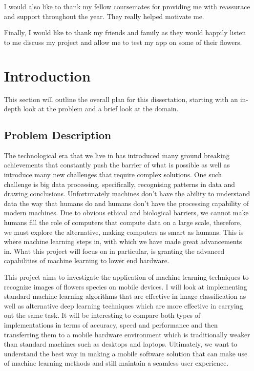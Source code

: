 \documentclass[12pt,a4paper]{report}
\begin{document}
I would also like to thank my fellow coursemates for providing me with reassurace and support throughout the year. They
really helped motivate me.

\par

Finally, I would like to thank my friends and family as they would happily listen to me discuss my project and allow me
to test my app on some of their flowers.

\clearpage
{}
\chapter{Introduction}

This section will outline the overall plan for this dissertation, starting with an in-depth look at the problem and a 
brief look at the domain.

\section{Problem Description}

The technological era that we live in has introduced many ground breaking achievements that constantly push the barrier 
of what is possible as well as introduce many new challenges that require complex solutions. One such challenge is big 
data processing, specifically, recognising patterns in data and drawing conclusions. Unfortunately machines don't have 
the ability to understand data the way that humans do and humans don't have the processing capability of modern 
machines. Due to obvious ethical and biological barriers, we cannot make humans fill the role of computers that compute 
data on a large scale, therefore, we must explore the alternative, making computers as smart as humans. This is where 
machine learning steps in, with which we have made great advancements in. What this project will focus on in particular,
is granting the advanced capabilities of machine learning to lower end hardware.

\par

This project aims to investigate the application of machine learning techniques to recognize images of flowers species 
on mobile devices. I will look at implementing standard machine learning algorithms that are effective in image 
classification as well as alternative deep learning techniques which are more effective in carrying out the same task. 
It will be interesting to compare both types of implementations in terms of accuracy, speed and performance and then 
transferring them to a mobile hardware environment which is traditionally weaker than standard machines such as desktops
and laptops. Ultimately, we want to understand the best way in making a mobile software solution that can make use of 
machine learning methods and still maintain a seamless user experience.
\end{document}
